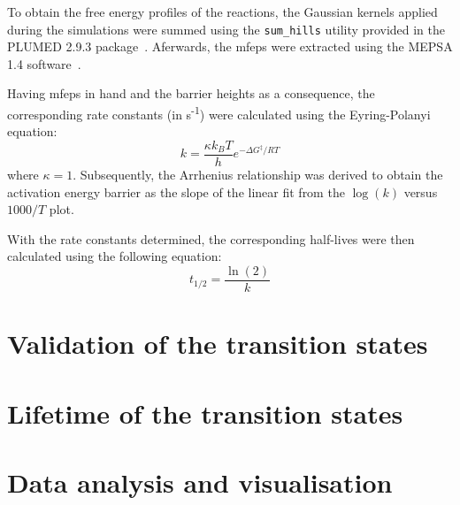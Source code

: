 To obtain the free energy profiles of the reactions, the Gaussian kernels applied during the simulations were summed using the \texttt{sum\_hills} utility provided in the PLUMED 2.9.3 package~\citep{tribelloPLUMED2New2014}. Aferwards, the \acp{mfep} were extracted using the MEPSA 1.4 software~\citep{marcos-alcaldeMEPSAMinimumEnergy2015}. 

Having \acp{mfep} in hand and the barrier heights as a consequence, the corresponding rate constants (in s\textsuperscript{-1}) were calculated using the Eyring-Polanyi equation:
\begin{equation}
    k = \frac{\kappa k_B T}{h} e^{-\Delta G^\ddagger / RT}
\end{equation}
where $\kappa = 1$. Subsequently, the Arrhenius relationship was derived to obtain the activation energy barrier as the slope of the linear fit from the \(\log(k)\) versus \(1000/T\) plot.

With the rate constants determined, the corresponding half-lives were then calculated using the following equation:
\begin{equation}
    t_{1/2} = \frac{\ln(2)}{k}
    \label{eq:half_life}
\end{equation}


\section{Validation of the transition states}


\section{Lifetime of the transition states}


\section{Data analysis and visualisation}